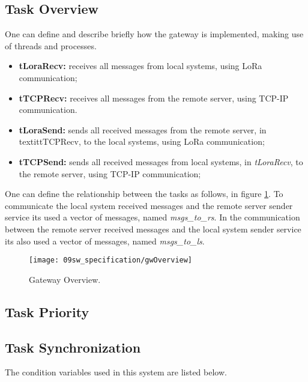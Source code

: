 \subsection{Task Overview}
One can define and describe briefly how the gateway is implemented, making use of threads and processes.

\begin{itemize}
	\item \textbf{tLoraRecv: } receives all messages from local systems, using LoRa communication;
	\item \textbf{tTCPRecv: } receives all messages from the remote server, using TCP-IP communication.	
	\item \textbf{tLoraSend: } sends all received messages from the remote server, in textit{tTCPRecv}, to the local systems, using LoRa communication;
	\item \textbf{tTCPSend: } sends all received messages from local systems, in \textit{tLoraRecv}, to the remote server, using TCP-IP communication;
\end{itemize}

One can define the relationship between the tasks as follows, in figure \ref{fig:gwOverview}. To communicate the local system received messages and the remote server sender service its used a vector of messages, named \textit{msgs\_to\_rs}. In the communication between the remote server received messages and the local system sender service its also used a vector of messages, named \textit{msgs\_to\_ls}.

\begin{figure}[H]
	\centering
	\texttt{[image: 09sw\_specification/gwOverview]}
	\caption{Gateway Overview.}
	\label{fig:gwOverview}
\end{figure}

\subsection{Task Priority}

\subsection{Task Synchronization}

The condition variables used in this system are listed below.

